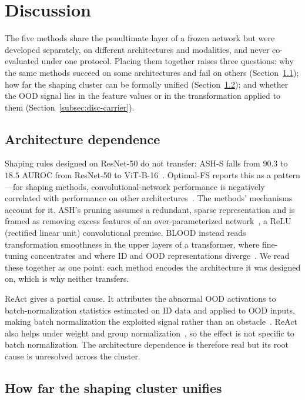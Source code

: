 \documentclass[a4paper]{article}
\begin{document}
\section{Discussion}
\label{sec:discussion}

The five methods share the penultimate layer of a frozen network but were developed
separately, on different architectures and modalities, and never co-evaluated under one
protocol. Placing them together raises three questions: why the same methods succeed on
some architectures and fail on others (Section~\ref{subsec:disc-arch}); how far the
shaping cluster can be formally unified (Section~\ref{subsec:disc-unify}); and whether
the OOD signal lies in the feature values or in the transformation applied to them
(Section~\ref{subsec:disc-carrier}).

\subsection{Architecture dependence}
\label{subsec:disc-arch}

Shaping rules designed on ResNet-50 do not transfer: ASH-S falls from $90.3$ to $18.5$
AUROC from ResNet-50 to ViT-B-16~\citep{optimalfs}. Optimal-FS reports this as a
pattern---for shaping methods, convolutional-network performance is negatively
correlated with performance on other architectures~\citep{optimalfs}. The methods'
mechanisms account for it. ASH's pruning assumes a redundant, sparse representation and
is framed as removing excess features of an over-parameterized
network~\citep{ash}, a ReLU (rectified linear unit) convolutional premise. BLOOD instead reads transformation
smoothness in the upper layers of a transformer, where fine-tuning concentrates and
where ID and OOD representations diverge~\citep{blood}. We read these together as one
point: each method encodes the architecture it was designed on, which is why neither
transfers.

ReAct gives a partial cause. It attributes the abnormal OOD activations to
batch-normalization statistics estimated on ID data and applied to OOD inputs, making
batch normalization the exploited signal rather than an obstacle~\citep{react}. ReAct
also helps under weight and group normalization~\citep{react}, so the effect is not
specific to batch normalization. The architecture dependence is therefore real but its
root cause is unresolved across the cluster.

\subsection{How far the shaping cluster unifies}
\label{subsec:disc-unify}
\end{document}
